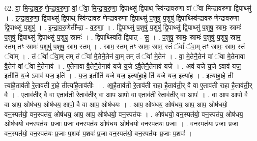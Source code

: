 \documentclass[17pt]{extarticle}
\begin{document}
62. वा॒ मि॒न्द्रा॒व॒रु॒ णे॒न्द्रा॒व॒रु॒णा॒ वां॒ ॅवा॒ मि॒न्द्रा॒व॒रु॒णा॒ द्वि॒पाथ्सु॑ द्वि॒पाथ् स्वि॑न्द्रावरुणा वां ॅवा मिन्द्रावरुणा द्वि॒पाथ्सु॑ । . इ॒न्द्रा॒व॒रु॒णा॒ द्वि॒पाथ्सु॑ द्वि॒पाथ् स्वि॑न्द्रावरु णेन्द्रावरुणा द्वि॒पाथ्सु॑ प॒शुषु॑ प॒शुषु॑ द्वि॒पाथ्स्वि॑न्द्रावरु णेन्द्रावरुणा द्वि॒पाथ्सु॑ प॒शुषु॑ । . इ॒न्द्रा॒व॒रु॒णेती᳚न्द्रा - व॒रु॒णा॒ । . द्वि॒पाथ्सु॑ प॒शुषु॑ प॒शुषु॑ द्वि॒पाथ्सु॑ द्वि॒पाथ्सु॑ प॒शुषु॒ स्रामः॒ स्रामः॑ प॒शुषु॑ द्वि॒पाथ्सु॑ द्वि॒पाथ्सु॑ प॒शुषु॒ स्रामः॑ । . द्वि॒पाथ्स्विति॑ द्वि॒पात् - सु॒ । . प॒शुषु॒ स्रामः॒ स्रामः॑ प॒शुषु॑ प॒शुषु॒ स्राम॒ स्तम् तꣳ स्रामः॑ प॒शुषु॑ प॒शुषु॒ स्राम॒ स्तम् । . स्राम॒ स्तम् तꣳ स्रामः॒ स्राम॒ स्तं ॅवां᳚ ॅवा॒म् तꣳ स्रामः॒ स्राम॒ स्तं ॅवा᳚म् । . तं ॅवां᳚ ॅवा॒म् तम् तं ॅवा॑ मे॒तेनै॒तेन॑ वा॒म् तम् तं ॅवा॑ मे॒तेन॑ । . वा॒ मे॒तेनै॒तेन॑ वां ॅवा मे॒तेनावा वै॒तेन॑ वां ॅवा मे॒तेनाव॑ । . ए॒तेनावा वै॒तेनै॒तेनाव॑ यजे य॒जे ऽवै॒तेनै॒तेनाव॑ यजे । . अव॑ यजे य॒जे ऽवाव॑ यज॒ इतीति॑ य॒जे ऽवाव॑ यज॒ इति॑ । . य॒ज॒ इतीति॑ यजे यज॒ इत्या॑हा॒हे ति॑ यजे यज॒ इत्या॑ह । . इत्या॑हा॒हे ती त्या॑है॒ताव॑ती रे॒ताव॑ती रा॒हे तीत्या॑है॒ताव॑तीः । . आ॒है॒ताव॑ती रे॒ताव॑ती राहा है॒ताव॑ती॒र् वै वा ए॒ताव॑ती राहा है॒ताव॑ती॒र् वै । . ए॒ताव॑ती॒र् वै वा ए॒ताव॑ती रे॒ताव॑ती॒र् वा आप॒ आपो॒ वा ए॒ताव॑ती रे॒ताव॑ती॒र् वा आपः॑ । . वा आप॒ आपो॒ वै वा आप॒ ओष॑धय॒ ओष॑धय॒ आपो॒ वै वा आप॒ ओष॑धयः । . आप॒ ओष॑धय॒ ओष॑धय॒ आप॒ आप॒ ओष॑धयो॒ वन॒स्पत॑यो॒ वन॒स्पत॑य॒ ओष॑धय॒ आप॒ आप॒ ओष॑धयो॒ वन॒स्पत॑यः । . ओष॑धयो॒ वन॒स्पत॑यो॒ वन॒स्पत॑य॒ ओष॑धय॒ ओष॑धयो॒ वन॒स्पत॑यः प्र॒जाः प्र॒जा वन॒स्पत॑य॒ ओष॑धय॒ ओष॑धयो॒ वन॒स्पत॑यः प्र॒जाः । . वन॒स्पत॑यः प्र॒जाः प्र॒जा वन॒स्पत॑यो॒ वन॒स्पत॑यः प्र॒जाः प॒शवः॑ प॒शवः॑ प्र॒जा वन॒स्पत॑यो॒ वन॒स्पत॑यः प्र॒जाः प॒शवः॑ । \newline
\end{document}
